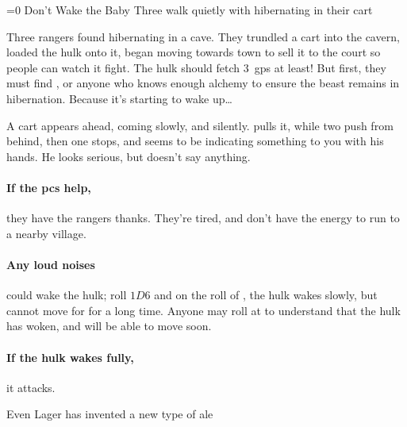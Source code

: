 \ifnum\value{temperature}=0
  {Don't Wake the Baby}%
  {Three  walk quietly with  hibernating in their cart}%

  Three \glspl{ranger} found  hibernating in a cave.
  They trundled a cart into the cavern, loaded the \gls{hulk} onto it, began moving towards town to sell it to the \gls{court} so people can watch it fight.
  The \gls{hulk} should fetch 3~\glspl{gp} at least!
  But first, they must find , or anyone who knows enough \gls{alchemy} to ensure the beast remains in hibernation.
  Because it's starting to wake up\ldots

  \begin{boxtext}
    A cart appears ahead, coming slowly, and silently.
     pulls it, while two push from behind, then one stops, and seems to be indicating something to you with his hands.
    He looks serious, but doesn't say anything.
  \end{boxtext}

  \paragraph{If the \glspl{pc} help,}
  they have the \glspl{ranger} thanks.
  They're tired, and don't have the energy to run to a nearby \gls{village}.


  \paragraph{Any loud noises}
  could wake the \gls{hulk}; roll $1D6$ and on the roll of , the \gls{hulk} wakes slowly, but cannot move for for a long time.
  Anyone may roll  at \tn[12] to understand that the \gls{hulk} has woken, and will be able to move soon.

  \paragraph{If the \gls{hulk} wakes fully,}
  it attacks.

  \umberhulk

\fi

{Even Lager}%
{ has invented a new type of ale}%

